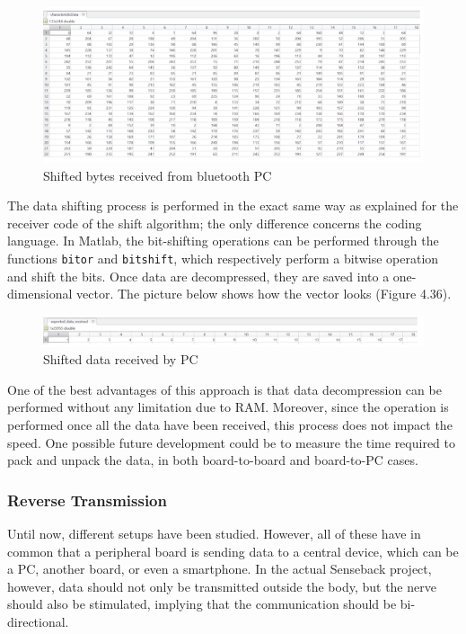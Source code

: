 \documentclass{Configuration_Files/PoliMi3i_thesis}
\begin{document}
\begin{figure}[H]
    \centering
    \includegraphics[scale=0.6]{Board Windows PC/7.png}
    \caption{Shifted bytes received from bluetooth PC}
    \label{boardwindows_7}
\end{figure}

The data shifting process is performed in the exact same way as explained for the receiver code of the shift algorithm; the only difference concerns the coding language. In Matlab, the bit-shifting operations can be performed through the functions \texttt{bitor} and \texttt{bitshift}, which respectively perform a bitwise operation and shift the bits. Once data are decompressed, they are saved into a one-dimensional vector. The picture below shows how the vector looks (Figure 4.36).

\begin{figure}[H]
    \centering
    \includegraphics[scale=0.6]{Board Windows PC/8.png}
    \caption{Shifted data received by PC}
    \label{boardwindows_8}
\end{figure}

One of the best advantages of this approach is that data decompression can be performed without any limitation due to RAM. Moreover, since the operation is performed once all the data have been received, this process does not impact the speed. One possible future development could be to measure the time required to pack and unpack the data, in both board-to-board and board-to-PC cases.

\subsubsection{Reverse Transmission}

Until now, different setups have been studied. However, all of these have in common that a peripheral board is sending data to a central device, which can be a PC, another board, or even a smartphone. In the actual Senseback project, however, data should not only be transmitted outside the body, but the nerve should also be stimulated, implying that the communication should be bi-directional.
\end{document}
